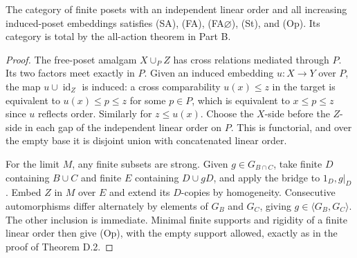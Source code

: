 \begin{corollary}\label{B:poset-op}
The category of finite posets with an independent linear order and all
increasing induced-poset embeddings satisfies (SA), (FA), (FA$\varnothing$),
(St), and (Op). Its category is total by the all-action theorem in Part B.
\end{corollary}
\begin{proof}
The free-poset amalgam $X\cup_P Z$ has cross relations mediated through
$P$. Its two factors meet exactly in $P$. Given an induced embedding
$u:X\to Y$ over $P$, the map $u\cup\operatorname{id}_Z$ is induced:
a cross comparability $u(x)\leq z$ in the target is equivalent to
$u(x)\leq p\leq z$ for some $p\in P$, which is equivalent to
$x\leq p\leq z$ since $u$ reflects order. Similarly for $z\leq u(x)$.
Choose the $X$-side before the $Z$-side in each gap of the independent
linear order on $P$. This is functorial, and over the empty base it is
disjoint union with concatenated linear order.

For the limit $M$, any finite subsets are strong. Given
$g\in G_{B\cap C}$, take finite $D$ containing $B\cup C$ and finite
$E$ containing $D\cup gD$, and apply the bridge to $1_D,g|_D$.
Embed $Z$ in $M$ over $E$ and extend its $D$-copies by homogeneity.
Consecutive automorphisms differ alternately by elements of $G_B$
and $G_C$, giving $g\in\langle G_B,G_C\rangle$. The other inclusion
is immediate. Minimal finite supports and rigidity of a finite
linear order then give (Op), with the empty support allowed, exactly
as in the proof of Theorem D.2.
\end{proof}


